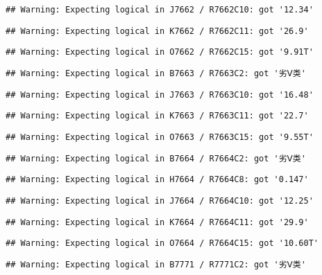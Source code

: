 \documentclass[
]{article}
\begin{document}
\begin{verbatim}
## Warning: Expecting logical in J7662 / R7662C10: got '12.34'
\end{verbatim}

\begin{verbatim}
## Warning: Expecting logical in K7662 / R7662C11: got '26.9'
\end{verbatim}

\begin{verbatim}
## Warning: Expecting logical in O7662 / R7662C15: got '9.91T'
\end{verbatim}

\begin{verbatim}
## Warning: Expecting logical in B7663 / R7663C2: got '劣Ⅴ类'
\end{verbatim}

\begin{verbatim}
## Warning: Expecting logical in J7663 / R7663C10: got '16.48'
\end{verbatim}

\begin{verbatim}
## Warning: Expecting logical in K7663 / R7663C11: got '22.7'
\end{verbatim}

\begin{verbatim}
## Warning: Expecting logical in O7663 / R7663C15: got '9.55T'
\end{verbatim}

\begin{verbatim}
## Warning: Expecting logical in B7664 / R7664C2: got '劣Ⅴ类'
\end{verbatim}

\begin{verbatim}
## Warning: Expecting logical in H7664 / R7664C8: got '0.147'
\end{verbatim}

\begin{verbatim}
## Warning: Expecting logical in J7664 / R7664C10: got '12.25'
\end{verbatim}

\begin{verbatim}
## Warning: Expecting logical in K7664 / R7664C11: got '29.9'
\end{verbatim}

\begin{verbatim}
## Warning: Expecting logical in O7664 / R7664C15: got '10.60T'
\end{verbatim}

\begin{verbatim}
## Warning: Expecting logical in B7771 / R7771C2: got '劣Ⅴ类'
\end{verbatim}
\end{document}
